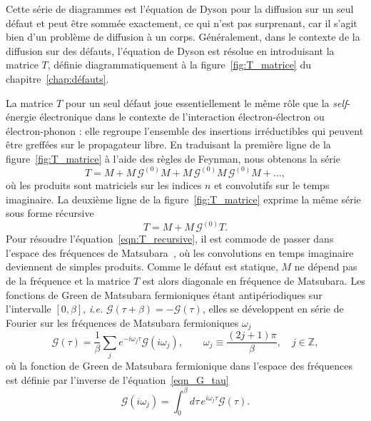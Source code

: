 Cette série de diagrammes est l'équation de Dyson pour la diffusion sur un seul défaut et peut être sommée exactement, ce qui n'est pas surprenant, car il s'agit bien d'un problème de diffusion à un corps. Généralement, dans le contexte de la diffusion sur des défauts, l'équation de Dyson est résolue en introduisant la matrice $T$, définie diagrammatiquement à la figure~\ref{fig:T_matrice} du chapitre~\ref{chap:défauts}.

La matrice $T$ pour un seul défaut joue essentiellement le même rôle que la \textit{self}-énergie électronique dans le contexte de l'interaction électron-électron ou électron-phonon : elle regroupe l'ensemble des insertions irréductibles qui peuvent être greffées sur le propagateur libre. En traduisant la première ligne de la figure~\ref{fig:T_matrice} à l'aide des règles de Feynman, nous obtenons la série
\begin{equation}
    T = M + M\,\mathcal{G}^{(0)}M + M\,\mathcal{G}^{(0)}M\,\mathcal{G}^{(0)}M+\dots,
    \label{eqn:T_serie}
\end{equation}
où les produits sont matriciels sur les indices $n$ et convolutifs sur le temps imaginaire. La deuxième ligne de la figure~\ref{fig:T_matrice} exprime la même série sous forme récursive
\begin{equation}
    T = M + M\,\mathcal{G}^{(0)}T.
    \label{eqn:T_recursive}
\end{equation}
Pour résoudre l'équation~\eqref{eqn:T_recursive}, il est commode de passer dans l'espace des fréquences de Matsubara~\cite{matsubaraNewApproachQuantumStatistical1955}, où les convolutions en temps imaginaire deviennent de simples produits. Comme le défaut est statique, $M$ ne dépend pas de la fréquence et la matrice $T$ est alors diagonale en fréquence de Matsubara. Les fonctions de Green de Matsubara fermioniques étant antipériodiques sur l'intervalle $[0,\beta]$, \textit{i.e.} $\mathcal{G}(\tau+\beta)=-\mathcal{G}(\tau)$, elles se développent en série de Fourier sur les fréquences de Matsubara fermioniques $\omega_j$
\begin{equation}
    \mathcal{G}(\tau) = \frac{1}{\beta}\sum_{j}e^{-i\omega_j\tau}\mathcal{G}(i\omega_j),\qquad \omega_j\equiv \frac{(2j+1)\pi}{\beta},\quad j \in\mathbb{Z},\label{eqn_G_tau}
\end{equation}
où la fonction de Green de Matsubara fermionique dans l'espace des fréquences est définie par l'inverse de l'équation~\eqref{eqn_G_tau}
\begin{equation}
    \mathcal{G}(i\omega_j) = \int_0^\beta d\tau\, e^{i\omega_j\tau}\mathcal{G}(\tau)\label{eqn_G_w}.
\end{equation}
